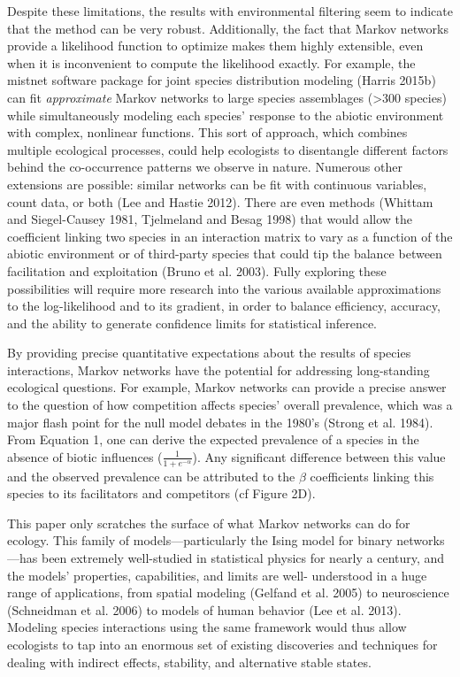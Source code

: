 \documentclass[12pt,]{article}
\begin{document}
\begin{spacing}{1.9}
\begin{flushleft}
Despite these limitations, the results with environmental filtering seem
to indicate that the method can be very robust. Additionally, the fact
that Markov networks provide a likelihood function to optimize makes
them highly extensible, even when it is inconvenient to compute the
likelihood exactly. For example, the mistnet software package for joint
species distribution modeling (Harris 2015b) can fit \emph{approximate}
Markov networks to large species assemblages (\textgreater{}300 species)
while simultaneously modeling each species' response to the abiotic
environment with complex, nonlinear functions. This sort of approach,
which combines multiple ecological processes, could help ecologists to
disentangle different factors behind the co-occurrence patterns we
observe in nature. Numerous other extensions are possible: similar
networks can be fit with continuous variables, count data, or both (Lee
and Hastie 2012). There are even methods (Whittam and Siegel-Causey
1981, Tjelmeland and Besag 1998) that would allow the coefficient
linking two species in an interaction matrix to vary as a function of
the abiotic environment or of third-party species that could tip the
balance between facilitation and exploitation (Bruno et al. 2003). Fully
exploring these possibilities will require more research into the
various available approximations to the log-likelihood and to its
gradient, in order to balance efficiency, accuracy, and the ability to
generate confidence limits for statistical inference.

By providing precise quantitative expectations about the results of
species interactions, Markov networks have the potential for addressing
long-standing ecological questions. For example, Markov networks can
provide a precise answer to the question of how competition affects
species' overall prevalence, which was a major flash point for the null
model debates in the 1980's (Strong et al. 1984). From Equation 1, one
can derive the expected prevalence of a species in the absence of biotic
influences (\(\frac{1}{1 + e^{-\alpha}}\)). Any significant difference
between this value and the observed prevalence can be attributed to the
\(\beta\) coefficients linking this species to its facilitators and
competitors (cf Figure 2D).

This paper only scratches the surface of what Markov networks can do for
ecology. This family of models---particularly the Ising model for binary
networks---has been extremely well-studied in statistical physics for
nearly a century, and the models' properties, capabilities, and limits
are well- understood in a huge range of applications, from spatial
modeling (Gelfand et al. 2005) to neuroscience (Schneidman et al. 2006)
to models of human behavior (Lee et al. 2013). Modeling species
interactions using the same framework would thus allow ecologists to tap
into an enormous set of existing discoveries and techniques for dealing
with indirect effects, stability, and alternative stable states.


\end{flushleft}
\end{spacing}
\end{document}

